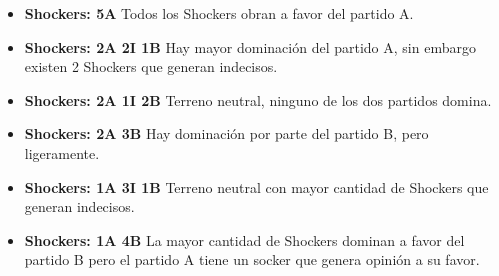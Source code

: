 \begin{itemize}
    \item \textbf{Shockers: 5A} Todos los Shockers obran a favor del partido A.
    \item \textbf{Shockers: 2A 2I 1B} Hay mayor dominación del partido A, sin embargo existen 2 Shockers que generan indecisos.
    \item \textbf{Shockers: 2A 1I 2B} Terreno neutral, ninguno de los dos partidos domina.
    \item \textbf{Shockers: 2A 3B} Hay dominación por parte del partido B, pero ligeramente.
    \item \textbf{Shockers: 1A 3I 1B} Terreno neutral con mayor cantidad de Shockers que generan indecisos.
    \item \textbf{Shockers: 1A 4B} La mayor cantidad de Shockers dominan a favor del partido B pero el partido A tiene un socker que genera opinión a su favor.  
\end{itemize}

